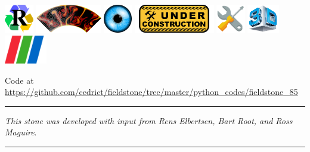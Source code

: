 \noindent
\includegraphics[height=1.25cm]{images/pictograms/replication}
\includegraphics[height=1.25cm]{images/pictograms/aspect_logo}
\includegraphics[height=1.25cm]{images/pictograms/visualisation}
\includegraphics[height=1.25cm]{images/pictograms/under_construction}
\includegraphics[height=1.25cm]{images/pictograms/tools}
\includegraphics[height=1.25cm]{images/pictograms/3d}
\includegraphics[height=1.25cm]{images/pictograms/paraview}


\begin{center}
Code at \url{https://github.com/cedrict/fieldstone/tree/master/python_codes/fieldstone_85}
\end{center}

\par\noindent\rule{\textwidth}{0.4pt}

{\sl This stone was developed with input from Rens Elbertsen, Bart Root, and Ross Maguire}. 

\par\noindent\rule{\textwidth}{0.4pt}


